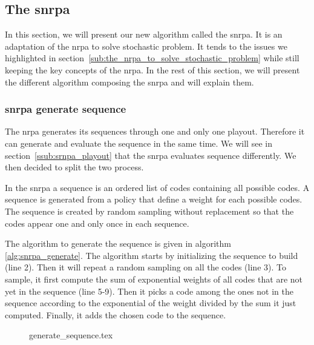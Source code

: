 \subsection{The \acrlong{snrpa}}%
\label{sub:the_snrpa}

In this section, we will present our new algorithm called the \gls{snrpa}.
It is an adaptation of the \gls{nrpa} to solve stochastic problem.
It tends to the issues we highlighted in section~\ref{sub:the_nrpa_to_solve_stochastic_problem} while still keeping the key concepts of the \gls{nrpa}.
In the rest of this section, we will present the different algorithm composing the \gls{snrpa} and will explain them.

\subsubsection{\acrshort{snrpa} generate sequence}%
\label{ssub:snrpa_sequence_generation}

The \gls{nrpa} generates its sequences through one and only one playout.
Therefore it can generate and evaluate the sequence in the same time.
We will see in section~\ref{ssub:srnpa_playout} that the \gls{snrpa} evaluates sequence differently.
We then decided to split the two process.

In the \gls{snrpa} a sequence is an ordered list of codes containing all possible codes.
A sequence is generated from a policy that define a weight for each possible codes.
The sequence is created by random sampling without replacement so that the codes appear one and only once in each sequence.

The algorithm to generate the sequence is given in algorithm \ref{alg:snrpa_generate}.
The algorithm starts by initializing the sequence to build (line 2).
Then it will repeat a random sampling on all the codes (line 3).
To sample, it first compute the sum of exponential weights of all codes that are not yet in the sequence (line 5-9).
Then it picks a code among the ones not in the sequence according to the exponential of the weight divided by the sum it just computed.
Finally, it adds the chosen code to the sequence.

\begin{figure}[htpb]
    \centering
    \begin{minipage}{.7\linewidth}
        {generate_sequence.tex}
    \end{minipage}
\end{figure}

